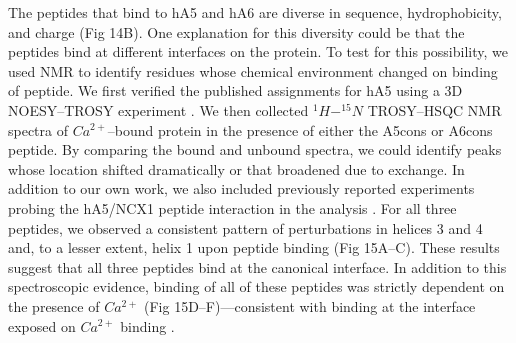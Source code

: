The peptides that bind to hA5 and hA6 are diverse in sequence, hydrophobicity,
and charge (Fig 14B). One explanation for this diversity could be that
the peptides bind at different interfaces on the protein. To test
for this possibility, we used NMR to identify residues whose chemical
environment changed on binding of peptide. We first verified the published
assignments for hA5 using a 3D NOESY--TROSY experiment \citep{bertini_solution_2009}.
We then collected $^{1}H-^{15}N$ TROSY--HSQC NMR spectra of $Ca^{2+}$--bound
protein in the presence of either the A5cons or A6cons peptide. By
comparing the bound and unbound spectra, we could identify peaks whose
location shifted dramatically or that broadened due to exchange. In
addition to our own work, we also included previously reported experiments
probing the hA5/NCX1 peptide interaction in the analysis \citep{liriano_structure_2012}.
For all three peptides, we observed a consistent pattern of perturbations
in helices 3 and 4 and, to a lesser extent, helix 1 upon peptide binding
(Fig 15A--C). These results suggest that all three peptides bind at
the canonical interface. In addition to this spectroscopic evidence,
binding of all of these peptides was strictly dependent on the presence
of $Ca^{2+}$ (Fig 15D--F)---consistent with binding at the interface
exposed on $Ca^{2+}$ binding \citep{bertini_solution_2009}.

